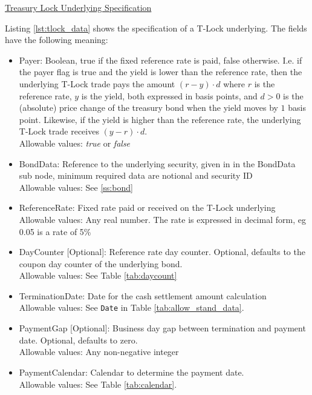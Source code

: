 \underline{Treasury Lock Underlying Specification}

Listing \ref{lst:tlock_data} shows the specification of a T-Lock underlying. The fields have the following meaning:

\begin{itemize}
\item Payer: Boolean, true if the fixed reference rate is paid, false otherwise. I.e. if the payer flag is true and the
  yield is lower than the reference rate, then the underlying T-Lock trade pays the amount $(r-y) \cdot d$ where $r$ is
  the reference rate, $y$ is the yield, both expressed in basis points, and $d>0$ is the (absolute) price change of the
  treasury bond when the yield moves by $1$ basis point. Likewise, if the yield is higher than the reference rate, the
  underlying T-Lock trade receives $(y-r) \cdot d$. \\
  Allowable values: \emph{true} or \emph{false}

\item BondData: Reference to the underlying security, given in in the BondData sub node, minimum required data are notional and security ID \\
  Allowable values: See \ref{ss:bond}

\item ReferenceRate: Fixed rate paid or received on the T-Lock underlying \\
  Allowable values: Any real number. The rate is expressed in decimal form, eg 0.05 is a rate of 5\%

\item DayCounter [Optional]: Reference rate day counter. Optional, defaults to the coupon day counter of the underlying bond. \\
  Allowable values: See Table \ref{tab:daycount}

\item TerminationDate: Date for the cash settlement amount calculation \\
  Allowable values: See \lstinline!Date! in Table \ref{tab:allow_stand_data}.

\item PaymentGap [Optional]: Business day gap between termination and payment date. Optional, defaults to zero. \\
  Allowable values: Any non-negative integer

\item PaymentCalendar: Calendar to determine the payment date. \\
  Allowable values: See Table \ref{tab:calendar}.
\end{itemize}

